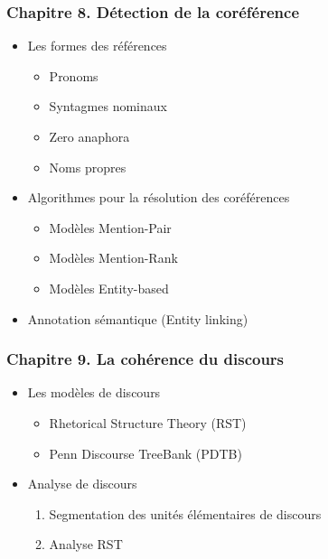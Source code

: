 \documentclass[11pt, a4paper]{article}
\begin{document}
\begin{tcolorbox}
\subsubsection*{Chapitre 8. Détection de la coréférence}

\begin{multicols}{2}
	\begin{itemize}
		
		\item Les formes des références
		\begin{itemize}
			\item Pronoms 
			\item Syntagmes nominaux
			\item Zero anaphora 
			\item Noms propres
		\end{itemize}
	
		\item Algorithmes pour la résolution des coréférences
		\begin{itemize}
			\item Modèles Mention-Pair
			\item Modèles Mention-Rank
			\item Modèles Entity-based 
		\end{itemize}
	
		\item Annotation sémantique (Entity linking)
		
	\end{itemize}
\end{multicols}
\end{tcolorbox}

\begin{tcolorbox}
\subsubsection*{Chapitre 9. La cohérence du discours}

\begin{multicols}{2}
	\begin{itemize}
	
		\item Les modèles de discours
		\begin{itemize}
			\item Rhetorical Structure Theory (RST)
			\item Penn Discourse TreeBank (PDTB)
		\end{itemize}
	
		\item Analyse de discours
		\begin{enumerate}
			\item Segmentation des unités élémentaires de discours
			\item Analyse RST
		\end{enumerate}
		
	\end{itemize}
\end{multicols}
\end{tcolorbox}
\end{document}
